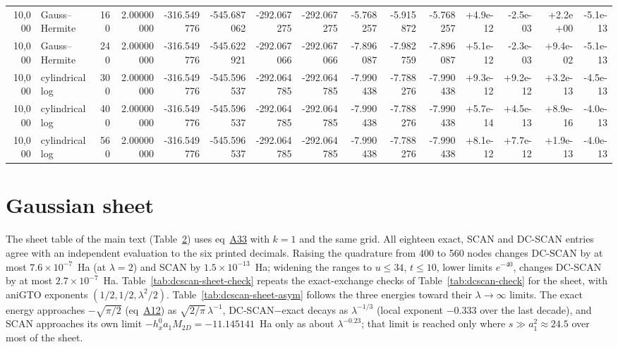 \documentclass[journal=jctcce,manuscript=suppinfo]{achemso}
\begin{document}
\begin{table}[H]
{\begin{tabular}{@{}rlrr|rrrrrrr|rrrr@{}}
10,000 & Gauss--Hermite & 160 & 2.00000000 & -316.549776 & -545.687062 & -292.067275 & -292.067275 & -5.768257 & -5.915872 & -5.768257 & +4.9e-12 & -2.5e-03 & +2.2e+00 & -5.1e-13 \\
10,000 & Gauss--Hermite & 240 & 2.00000000 & -316.549776 & -545.622921 & -292.067066 & -292.067066 & -7.896087 & -7.982759 & -7.896087 & +5.1e-12 & -2.3e-03 & +9.4e-02 & -5.1e-13 \\
10,000 & cylindrical log & 300 & 2.00000000 & -316.549776 & -545.596537 & -292.064785 & -292.064785 & -7.990438 & -7.788276 & -7.990438 & +9.3e-12 & +9.2e-12 & +3.2e-13 & -4.5e-13 \\
10,000 & cylindrical log & 400 & 2.00000000 & -316.549776 & -545.596537 & -292.064785 & -292.064785 & -7.990438 & -7.788276 & -7.990438 & +5.7e-14 & +4.5e-13 & +8.9e-16 & -4.0e-13 \\
10,000 & cylindrical log & 560 & 2.00000000 & -316.549776 & -545.596537 & -292.064785 & -292.064785 & -7.990438 & -7.788276 & -7.990438 & +8.1e-12 & +7.7e-12 & +1.9e-13 & -4.0e-13 \\

\bottomrule
\end{tabular}}
\end{table}

\section{Gaussian sheet}
\label{sec:dcscan-sheet}
The sheet table of the main text (Table~\href{main.pdf\#table.2}{2}) uses
eq~\href{main.pdf\#equation.33}{A33} with $k=1$ and the same grid.  All eighteen exact, SCAN
and DC-SCAN entries agree with an independent evaluation to the six printed
decimals.  Raising the quadrature from 400 to 560 nodes changes DC-SCAN by at
most $7.6\times10^{-7}$~Ha (at $\lambda=2$) and SCAN by
$1.5\times10^{-13}$~Ha; widening the ranges to $u\le34$, $t\le10$, lower
limits $e^{-40}$, changes DC-SCAN by at most $2.7\times10^{-7}$~Ha.
Table~\ref{tab:dcscan-sheet-check} repeats the exact-exchange checks of
Table~\ref{tab:dcscan-check} for the sheet, with aniGTO exponents
$(1/2,1/2,\lambda^2/2)$.  Table~\ref{tab:dcscan-sheet-asym} follows the three
energies toward their $\lambda\to\infty$ limits.  The exact energy approaches
$-\sqrt{\pi/2}$ (eq~\href{main.pdf\#equation.12}{A12}) as $\sqrt{2/\pi}\,\lambda^{-1}$,
DC-SCAN$-$exact decays as $\lambda^{-1/3}$ (local exponent $-0.333$ over the
last decade), and SCAN approaches its own limit $-h_x^0a_1M_{2D}=-11.145141$~Ha
only as about $\lambda^{-0.23}$; that limit is reached only where
$s\gg a_1^2\approx24.5$ over most of the sheet.
\end{document}
